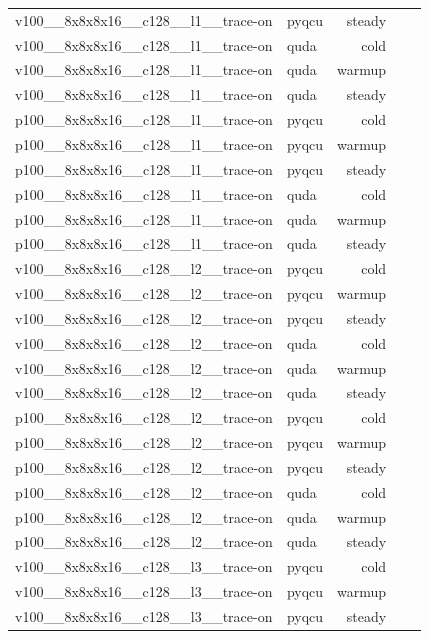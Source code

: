 \begin{table}[htbp]
\begin{tabular}{@{}llrrr@{}}
v100\_\_8x8x8x16\_\_c128\_\_l1\_\_trace-on & pyqcu & steady &  &  \\
v100\_\_8x8x8x16\_\_c128\_\_l1\_\_trace-on & quda & cold &  &  \\
v100\_\_8x8x8x16\_\_c128\_\_l1\_\_trace-on & quda & warmup &  &  \\
v100\_\_8x8x8x16\_\_c128\_\_l1\_\_trace-on & quda & steady &  &  \\
p100\_\_8x8x8x16\_\_c128\_\_l1\_\_trace-on & pyqcu & cold &  &  \\
p100\_\_8x8x8x16\_\_c128\_\_l1\_\_trace-on & pyqcu & warmup &  &  \\
p100\_\_8x8x8x16\_\_c128\_\_l1\_\_trace-on & pyqcu & steady &  &  \\
p100\_\_8x8x8x16\_\_c128\_\_l1\_\_trace-on & quda & cold &  &  \\
p100\_\_8x8x8x16\_\_c128\_\_l1\_\_trace-on & quda & warmup &  &  \\
p100\_\_8x8x8x16\_\_c128\_\_l1\_\_trace-on & quda & steady &  &  \\
v100\_\_8x8x8x16\_\_c128\_\_l2\_\_trace-on & pyqcu & cold &  &  \\
v100\_\_8x8x8x16\_\_c128\_\_l2\_\_trace-on & pyqcu & warmup &  &  \\
v100\_\_8x8x8x16\_\_c128\_\_l2\_\_trace-on & pyqcu & steady &  &  \\
v100\_\_8x8x8x16\_\_c128\_\_l2\_\_trace-on & quda & cold &  &  \\
v100\_\_8x8x8x16\_\_c128\_\_l2\_\_trace-on & quda & warmup &  &  \\
v100\_\_8x8x8x16\_\_c128\_\_l2\_\_trace-on & quda & steady &  &  \\
p100\_\_8x8x8x16\_\_c128\_\_l2\_\_trace-on & pyqcu & cold &  &  \\
p100\_\_8x8x8x16\_\_c128\_\_l2\_\_trace-on & pyqcu & warmup &  &  \\
p100\_\_8x8x8x16\_\_c128\_\_l2\_\_trace-on & pyqcu & steady &  &  \\
p100\_\_8x8x8x16\_\_c128\_\_l2\_\_trace-on & quda & cold &  &  \\
p100\_\_8x8x8x16\_\_c128\_\_l2\_\_trace-on & quda & warmup &  &  \\
p100\_\_8x8x8x16\_\_c128\_\_l2\_\_trace-on & quda & steady &  &  \\
v100\_\_8x8x8x16\_\_c128\_\_l3\_\_trace-on & pyqcu & cold &  &  \\
v100\_\_8x8x8x16\_\_c128\_\_l3\_\_trace-on & pyqcu & warmup &  &  \\
v100\_\_8x8x8x16\_\_c128\_\_l3\_\_trace-on & pyqcu & steady &  &  \\

\end{tabular}
\end{table}

